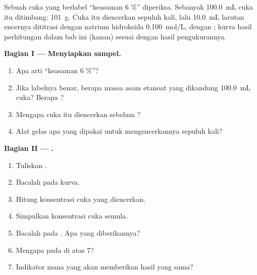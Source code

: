 \begin{problem}
\label{pb:g12:ph-conductivity-titrations:1}
Sebuah cuka yang berlabel ``keasaman 6 \%'' diperiksa. Sebanyak
\qty{100.0}{mL} cuka itu ditimbang: \qty{101}{g}. Cuka itu diencerkan
sepuluh kali, lalu \qty{10.0}{mL} larutan encernya dititrasi dengan
natrium hidroksida \qty{0.100}{mol/L}, dengan ; kurva hasil
perhitungan dalam bab ini (kanan) sesuai dengan hasil pengukurannya.

\medskip
\noindent\textbf{Bagian I --- Menyiapkan sampel.}
\begin{enumerate}
  \item Apa arti ``keasaman 6 \%''?
  \item Jika labelnya benar, berapa massa asam etanoat yang dikandung
        \qty{100.0}{mL} cuka? Berapa ?
  \item Mengapa cuka itu diencerkan sebelum ?
  \item Alat gelas apa yang dipakai untuk mengencerkannya sepuluh kali?
\end{enumerate}

\medskip
\noindent\textbf{Bagian II --- .}
\begin{enumerate}[resume]
  \item Tuliskan  .
  \item Bacalah  pada kurva.
  \item Hitung konsentrasi cuka yang diencerkan.
  \item Simpulkan konsentrasi cuka semula.
  \item Bacalah  pada . Apa yang diberikannya?
  \item Mengapa  pada  di atas 7?
  \item Indikator mana yang akan memberikan hasil yang sama?
\end{enumerate}


\end{problem}
